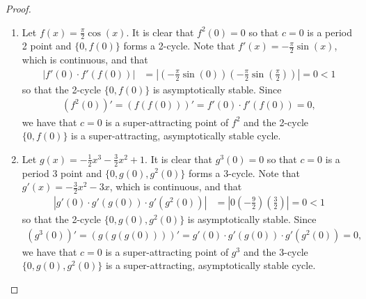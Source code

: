 \begin{proof}
  \begin{enumerate}
    \item Let $f(x) = \frac{\pi}{2} \cos(x)$. It is clear that $f^2(0) = 0$ so that $c=0$ is a period 2 point and
      $\{0, f(0)\}$ forms a 2-cycle.
      Note that $f'(x) = -\frac{\pi}{2}\sin(x)$, which is continuous, and that
      \begin{align*}
        \left|f'(0)\cdot f'(f(0))\right| &= \left|\left(-\frac{\pi}{2}\sin(0)\right)\left(-\frac{\pi}{2}\sin\left(\frac{\pi}{2}\right)\right)\right| = 0 < 1
      \end{align*}
      so that the 2-cycle $\{0, f(0)\}$ is asymptotically stable. Since
      \begin{align*}
        (f^2(0))' = (f(f(0)))' = f'(0)\cdot f'(f(0)) = 0,
      \end{align*}
      we have that $c=0$ is a super-attracting point of $f^2$ and the 2-cycle
      $\{0, f(0)\}$ is a super-attracting, asymptotically stable cycle.
    \item Let $g(x) = -\frac{1}{2}x^3 - \frac{3}{2}x^2 + 1.$ It is
      clear that $g^3(0) = 0$ so that $c=0$ is a period 3 point and $\{0, g(0), g^2(0)\}$
      forms a 3-cycle. Note that $g'(x) = -\frac{3}{2}x^2 - 3x$, which is continuous,
      and that
      \begin{align*}
        \left|g'(0)\cdot g'(g(0))\cdot g'(g^2(0))\right| &= \left|0 \left(-\frac{9}{2}\right)\left(\frac{3}{2}\right)\right| = 0 < 1
      \end{align*}
      so that the 2-cycle $\{0, g(0), g^2(0)\}$ is asymptotically stable. Since
      \begin{align*}
        (g^3(0))' = (g(g(g(0))))' = g'(0)\cdot g'(g(0))\cdot g'(g^2(0)) = 0,
      \end{align*}
      we have that $c=0$ is a super-attracting point of $g^3$ and the 3-cycle
      $\{0, g(0), g^2(0)\}$ is a super-attracting, asymptotically stable cycle.
  \end{enumerate}
\end{proof}
\newpage
